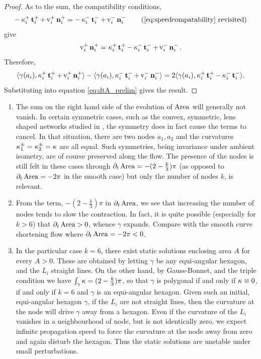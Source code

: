 \documentclass[11pt]{amsart}
\begin{document}
\begin{proof}
As to the sum, the compatibility conditions,
\[
-\curvecurv_i^+ \tang_i^+ + \tangspeed_i^+ \nor_i^+ = -\curvecurv_i^- \tang_i^- + \tangspeed_i^- \nor_i^- \tag{\ref{eq:speedcompatability} revisited}
\]
give
\[
\operatorname{v}_i^+ \operatorname{\mathbf{n}}_i^+ = \operatorname{\kappa}_i^+ \operatorname{\mathbf{t}}_i^+ -\operatorname{\kappa}_i^- \operatorname{\mathbf{t}}_i^- + \operatorname{v}_i^- \operatorname{\mathbf{n}}_i^-.
\]
Therefore,
\[
\langle{\gamma(a_i)},{\operatorname{\kappa}_i^+ \operatorname{\mathbf{t}}_i^+ + \operatorname{v}_i^+ \operatorname{\mathbf{n}}_i^+}\rangle - \langle{\gamma(a_i)},{\operatorname{\kappa}_i^- \operatorname{\mathbf{t}}_i^- + \operatorname{v}_i^- \operatorname{\mathbf{n}}_i^-}\rangle = 2\langle{\gamma(a_i)},{\operatorname{\kappa}_i^+ \operatorname{\mathbf{t}}_i^+ - \operatorname{\kappa}_i^- \operatorname{\mathbf{t}}_i^-}\rangle.
\]
Substituting into equation \eqref{eq:dtA_prelim} gives the result.
\end{proof}

\begin{remark}
\begin{enumerate}
\item The sum on the right hand side of the evolution of \(\operatorname{Area}\) will generally not vanish. In certain symmetric cases, such as the convex, symmetric, lens shaped networks studied in \cite{MR2763716}, the symmetry does in fact cause the terms to cancel. In that situation, there are two nodes \(a_1, a_2\) and the curvatures \(\operatorname{\kappa}^{\pm}_1 = \operatorname{\kappa}^{\pm}_2 = \kappa\) are all equal. Such symmetries, being invariance under ambient isometry, are of course preserved along the flow. The presence of the nodes is still felt in these cases through \(\partial_t \operatorname{Area} = -(2- \tfrac{k}{3})\pi\) (as opposed to \(\partial_t \operatorname{Area} = - 2\pi\) in the smooth case) but only the number of nodes \(k\), is relevant.

\item From the term, \(-(2- \tfrac{k}{3})\pi\) in \(\partial_t \operatorname{Area}\), we see that increasing the number of nodes tends to slow the contraction. In fact, it is quite possible (especially for \(k > 6\)) that \(\partial_t \operatorname{Area} > 0\), whence \(\gamma\) expands. Compare with the smooth curve shortening flow where \(\partial_t \operatorname{Area} = - 2\pi < 0\).

\item In the particular case \(k = 6\), there exist static solutions enclosing area \(A\) for every \(A > 0\). These are obtained by letting \(\gamma\) be any equi-angular hexagon, and the \(L_i\) straight lines. On the other hand, by Gauss-Bonnet, and the triple condition we have \(\int_{\gamma} \operatorname{\kappa} = (2 - \tfrac{k}{3}) \pi\), so that \(\gamma\) is polygonal if and only if \(\operatorname{\kappa} \equiv 0\), if and only if \(k = 6\) and \(\gamma\) is an equi-angular hexagon. Given such an initial, equi-angular hexagon \(\gamma\), if the \(L_i\) are not straight lines, then the curvature at the node will drive \(\gamma\) away from a hexagon. Even if the curvature of the \(L_i\) vanishes in a neighbourhood of node, but is not identically zero, we expect infinite propagation speed to force the curvature at the node away from zero and again disturb the hexagon. Thus the static solutions are unstable under small perturbations.

\end{enumerate}
\end{remark}
\end{document}
